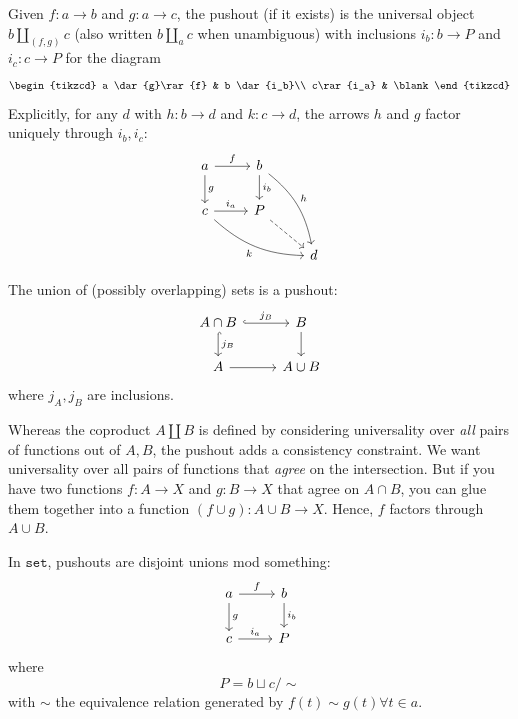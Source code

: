 \documentclass[a5paper]{scrartcl}
\def\setcat{\texttt{set}}
\begin{document}
\begin{defn}[Pushout]
  Given \(f: a \to b\) and \(g: a \to c\), the pushout (if it exists) is the universal object \(b\amalg_{(f,g)} c\) (also written \(b\amalg_a c\) when unambiguous) with inclusions \(i_b: b \to P\) and \(i_c: c\to P\) for the diagram
  \[
    \begin{tikzcd}
      a \dar{g}\rar{f} & b \dar{i_b}\\
      c\rar{i_a} & \blank
    \end{tikzcd}
  \]
  Explicitly, for any \(d\) with \(h: b\to d\)  and \(k: c\to d\), the arrows \(h\) and \(g\) factor uniquely through \(i_b,i_c\):
  \[
    \begin{tikzcd}
      a \dar{g}\rar{f} & b \dar{i_b} \ar[bend left=2em,"h"]{ddr}\\
      c\rar{i_a}\ar[bend right= 2em,swap,"k"]{drr} & P\ar[dashed]{rd} \\
      & & d
    \end{tikzcd}
  \]
\end{defn}
The union of (possibly overlapping) sets is a pushout:
\[
  \begin{tikzcd}
    A \cap B \rar[hook]{j_B} \dar[hook]{j_B}& B\dar \\
    A\rar & A \cup B
  \end{tikzcd}
\]
where \(j_A,j_B\) are inclusions.

Whereas the coproduct \(A\amalg B\) is defined by considering universality over \emph{all} pairs of functions out of \(A,B\), the pushout adds a consistency constraint. We want universality over all pairs of functions that \emph{agree} on the intersection. But if you have two functions \(f:A \to X\) and \(g: B\to X\) that agree on \(A\cap B\), you can glue them together into a function \((f\cup g): A\cup B \to X\). Hence, \(f\) factors through \(A\cup B\).

In \(\setcat\), pushouts are disjoint unions mod something:
\[
    \begin{tikzcd}
      a \dar{g}\rar{f} & b \dar{i_b}\\
      c\rar{i_a} & P
    \end{tikzcd}
\]
where
\[
  P = b \sqcup c / {\sim}
\]
with \(\sim\) the equivalence relation generated by \(f(t)\sim g(t) \forall t \in a\).
\end{document}
